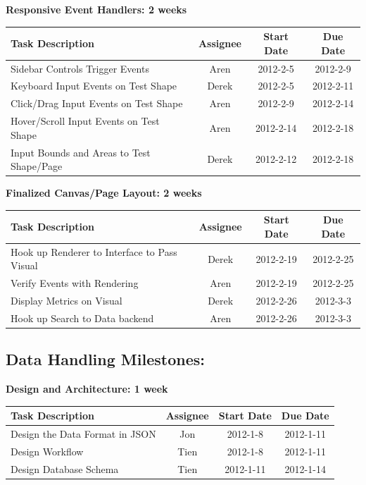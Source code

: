 \documentclass[12pt, letterpaper]{article}
\begin{document}
  \begin{center}
		{\bf Responsive Event Handlers: 2 weeks}
    \begin{tabular}{| p{8.3cm} || c | c | c | }
      \hline
      Task Description & Assignee & Start Date & Due Date \\
      \hline
 	    Sidebar Controls Trigger Events & Aren & 2012-2-5 & 2012-2-9 \\
	    Keyboard Input Events on Test Shape & Derek & 2012-2-5 & 2012-2-11 \\
	    Click/Drag Input Events on Test Shape & Aren & 2012-2-9 & 2012-2-14 \\
	    Hover/Scroll Input Events on Test Shape & Aren & 2012-2-14 & 2012-2-18 \\
	    Input Bounds and Areas to Test Shape/Page & Derek & 2012-2-12 & 2012-2-18 \\
      \hline
    \end{tabular}
  \end{center}

  \begin{center}
		{\bf Finalized Canvas/Page Layout: 2 weeks}
    \begin{tabular}{| p{8.3cm} || c | c | c | }
      \hline
      Task Description & Assignee & Start Date & Due Date \\
      \hline
	    Hook up Renderer to Interface to Pass Visual & Derek & 2012-2-19 & 2012-2-25 \\
	    Verify Events with Rendering & Aren & 2012-2-19 & 2012-2-25 \\
	    Display Metrics on Visual & Derek & 2012-2-26 & 2012-3-3 \\
	    Hook up Search to Data backend & Aren & 2012-2-26 & 2012-3-3 \\
      \hline
    \end{tabular}
  \end{center}

  	\subsection{Data Handling Milestones:}

  \begin{center}
		{\bf Design and Architecture: 1 week}
    \begin{tabular}{| p{8.3cm} || c | c | c | }
      \hline
      Task Description & Assignee & Start Date & Due Date \\
      \hline
	    Design the Data Format in JSON & Jon & 2012-1-8 & 2012-1-11 \\
	    Design Workflow & Tien & 2012-1-8 & 2012-1-11 \\
	    Design Database Schema & Tien & 2012-1-11 & 2012-1-14 \\    
      \hline
    \end{tabular}
  \end{center}
\end{document}

